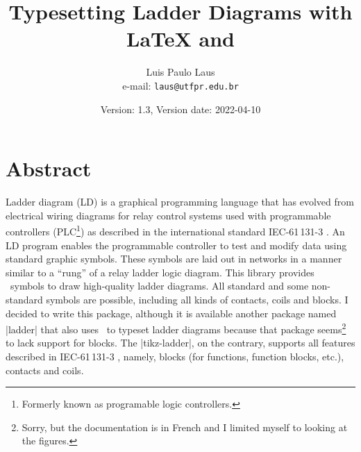 \documentclass[a4paper]{ltxdoc}
\begin{document}
\title{Typesetting Ladder Diagrams with \LaTeX{} and \tikzname{}}
\author{Luis Paulo Laus\\e-mail: \texttt{laus@utfpr.edu.br}}
\date{Version: 1.3, Version date: 2022-04-10}

\maketitle

\section{Abstract}
Ladder diagram (LD) is a graphical programming language that has evolved from electrical wiring diagrams for relay control systems used with programmable controllers (PLC\footnote{Formerly known as programable logic controllers.}) as described in the international standard IEC-61\,131-3 \cite{61131}. An LD program enables the programmable controller to test and modify data using standard graphic symbols. These symbols are laid out in networks in a manner similar to a ``rung'' of a relay ladder logic diagram. This library provides \tikzname\ symbols to draw high-quality ladder diagrams. All standard and some non-standard symbols are possible, including all kinds of contacts, coils and blocks. I decided to write this package, although it is available another package named |ladder| that also uses \tikzname\ to typeset ladder diagrams because that package seems\footnote{Sorry, but the documentation is in French and I limited myself to looking at the figures.} to lack support for blocks. The |tikz-ladder|, on the contrary, supports all features described in IEC-61\,131-3 \cite{61131}, namely, blocks (for functions, function blocks, etc.), contacts and coils.
\end{document}
